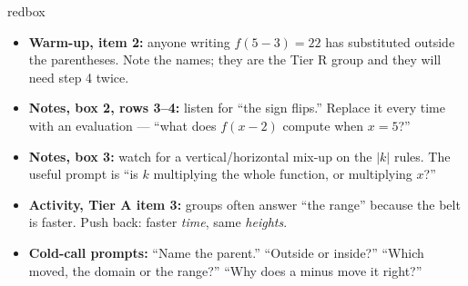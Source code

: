 \documentclass[10pt]{article}
\begin{document}
\begin{skillbox}{redbox}
\begin{itemize}[leftmargin=1.2em, itemsep=2pt, topsep=2pt]
  \item \textbf{Warm-up, item 2:} anyone writing $f(5-3)=22$ has substituted outside the
        parentheses. Note the names; they are the Tier R group and they will need step 4 twice.
  \item \textbf{Notes, box 2, rows 3--4:} listen for ``the sign flips.'' Replace it every time with
        an evaluation --- ``what does $f(x-2)$ compute when $x=5$?''
  \item \textbf{Notes, box 3:} watch for a vertical/horizontal mix-up on the $|k|$ rules. The
        useful prompt is ``is $k$ multiplying the whole function, or multiplying $x$?''
  \item \textbf{Activity, Tier A item 3:} groups often answer ``the range'' because the belt is
        faster. Push back: faster \emph{time}, same \emph{heights}.
  \item \textbf{Cold-call prompts:} ``Name the parent.'' ``Outside or inside?'' ``Which moved, the
        domain or the range?'' ``Why does a minus move it right?''
\end{itemize}
\end{skillbox}
\end{document}
